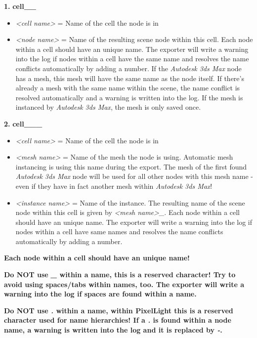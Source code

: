 \textbf{1.}
\textbf{cell\_<cell name>\_<node name>}
\begin{itemize}
\item{\emph{<cell name>} = Name of the cell the node is in}
\item{\emph{<node name>} = Name of the resulting scene node within this cell. Each node within a cell should have an unique name. The exporter will write a warning into the log if nodes within a cell have the same name and resolves the name conflicts automatically by adding a number. If the \emph{Autodesk 3ds Max} node has a mesh, this mesh will have the same name as the node itself. If there's already a mesh with the same name within the scene, the name conflict is resolved automatically and a warning is written into the log. If the mesh is instanced by \emph{Autodesk 3ds Max}, the mesh is only saved once.}
\end{itemize}

\textbf{2.}
\textbf{cell\_<cell name>\_<mesh name>\_<instance name>}
\begin{itemize}
\item{\emph{<cell name>} = Name of the cell the node is in}
\item{\emph{<mesh name>} = Name of the mesh the node is using. Automatic mesh instancing is using this name during the export. The mesh of the first found \emph{Autodesk 3ds Max} node will be used for all other nodes with this mesh name - even if they have in fact another mesh within \emph{Autodesk 3ds Max}!}
\item{\emph{<instance name>} = Name of the instance. The resulting name of the scene node within this cell is given by \emph{<mesh name>\_<instance name>}. Each node within a cell should have an unique name. The exporter will write a warning into the log if nodes within a cell have same names and resolves the name conflicts automatically by adding a number.}
\end{itemize}

\textbf{Each node within a cell should have an unique name!}

\textbf{Do NOT use \emph{\_} within a name, this is a reserved character! Try to avoid using spaces/tabs within names, too. The exporter will write a warning into the log if spaces are found within a name.}

\textbf{Do NOT use \emph{.} within a name, within PixelLight this is a reserved character used for name hierarchies! If  a \emph{.} is found within a node name, a warning is written into the log and it is replaced by \emph{-}.}

